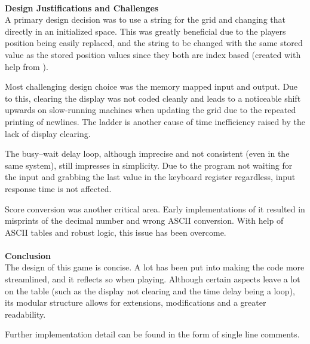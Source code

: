\documentclass[12pt]{article}
\begin{document}
\\
\textbf{Design Justifications and Challenges}\\
A primary design decision was to use a string for the grid and changing that directly in an initialized space. This was greatly beneficial due to the players position being easily replaced, and the string to be changed with the same stored value as the stored position values since they both are index based (created with help from \textcite{noauthor_undated-eh}).
\par Most challenging design choice was the memory mapped input and output. Due to this, clearing the display was not coded cleanly and leads to a noticeable shift upwards on slow-running machines when updating the grid due to the repeated printing of newlines. The ladder is another cause of time inefficiency raised by the lack of display clearing.
\par The busy–wait delay loop, although imprecise and not consistent (even in the same system), still impresses in simplicity. Due to the program not waiting for the input and grabbing the last value in the keyboard register regardless, input response time is not affected.
\par Score conversion was another critical area. Early implementations of it resulted in misprints of the decimal number and wrong ASCII conversion. With help of ASCII tables \parencite{wiki:xxx} and robust logic, this issue has been overcome.\\
\\
\textbf{Conclusion}\\
The design of this game is concise. A lot has been put into making the code more streamlined, and it reflects so when playing. Although certain aspects leave a lot on the table (such as the display not clearing and the time delay being a loop), its modular structure allows for extensions, modifications and a greater readability.
\par Further implementation detail can be found in the form of single line comments.

\printbibliography
\end{document}
